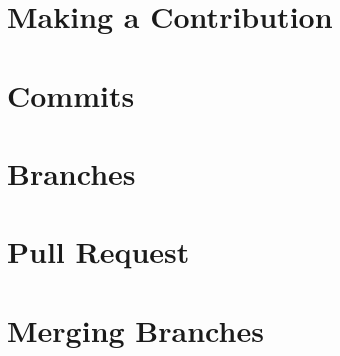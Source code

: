 \documentclass{article}
\begin{document}
\section{Making a Contribution}

\section{Commits}

\section{Branches}

\section{Pull Request}

\section{Merging Branches}
\end{document}
